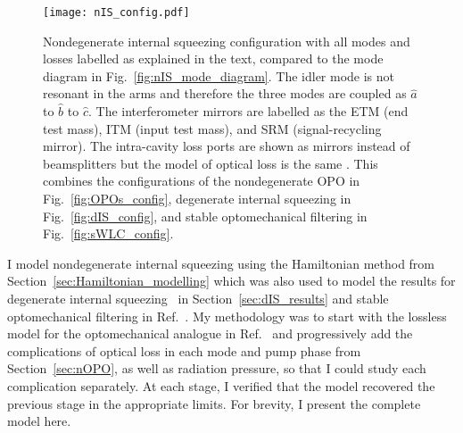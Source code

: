 \begin{figure}
	\centering
	\texttt{[image: nIS\_config.pdf]}
	\caption{ Nondegenerate internal squeezing configuration with all modes and losses labelled as explained in the text, compared to the mode diagram in Fig.~\ref{fig:nIS_mode_diagram}. The idler mode is not resonant in the arms and therefore the three modes are coupled as $\hat a$ to $\hat b$ to $\hat c$. The interferometer mirrors are labelled as the ETM (end test mass), ITM (input test mass), and SRM (signal-recycling mirror). The intra-cavity loss ports are shown as mirrors instead of beamsplitters but the model of optical loss is the same . This combines the configurations of the nondegenerate OPO in Fig.~\ref{fig:OPOs_config}, degenerate internal squeezing in Fig.~\ref{fig:dIS_config}, and stable optomechanical filtering in Fig.~\ref{fig:sWLC_config}.}
	\label{fig:nIS_config}
\end{figure}

I model nondegenerate internal squeezing using the Hamiltonian method from Section~\ref{sec:Hamiltonian_modelling} which was also used to model the results for degenerate internal squeezing~\cite{korobkoQuantumExpanderGravitationalwave2019} in Section~\ref{sec:dIS_results} and stable optomechanical filtering in Ref.~\cite{liBroadbandSensitivityImprovement2020}. %
My methodology was to start with the lossless model for the optomechanical analogue in Ref.~\cite{liBroadbandSensitivityImprovement2020} and progressively add the complications of optical loss in each mode and pump phase from Section~\ref{sec:nOPO}, as well as radiation pressure, so that I could study each complication separately. At each stage, I verified that the model recovered the previous stage in the appropriate limits.  For brevity, I present the complete model here.

